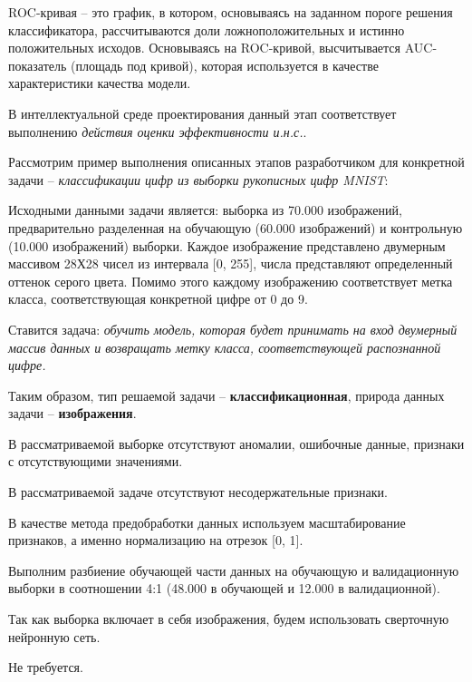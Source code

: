 ROC-кривая -- это график, в котором, основываясь на заданном пороге решения классификатора, рассчитываются доли ложноположительных и истинно положительных исходов. Основываясь на ROC-кривой, высчитывается AUC-показатель (площадь под кривой), которая используется в качестве характеристики качества модели.

В интеллектуальной среде проектирования данный этап соответствует выполнению \textit{действия оценки эффективности и.н.с.}.

Рассмотрим пример выполнения описанных этапов разработчиком для конкретной задачи -- \textit{классификации цифр из выборки рукописных цифр MNIST}:

\begin{textitemize}
\item Исходными данными задачи является: выборка из 70.000 изображений, предварительно разделенная на обучающую (60.000 изображений) и контрольную (10.000 изображений) выборки. Каждое изображение представлено двумерным массивом 28Х28 чисел из интервала [0, 255], числа представляют определенный оттенок серого цвета. Помимо этого каждому изображению соответствует метка класса, соответствующая конкретной цифре от 0 до 9.

Ставится задача: \textit{обучить модель, которая будет принимать на вход двумерный массив данных и возвращать метку класса, соответствующей распознанной цифре.}

Таким образом, тип решаемой задачи -- \textbf{классификационная}, природа данных задачи -- \textbf{изображения}.


\item В рассматриваемой выборке отсутствуют аномалии, ошибочные данные, признаки с отсутствующими значениями.


\item В рассматриваемой задаче отсутствуют несодержательные признаки.


\item В качестве метода предобработки данных используем масштабирование признаков, а именно нормализацию на отрезок [0, 1].


\item Выполним разбиение обучающей части данных на обучающую и валидационную выборки в соотношении 4:1 (48.000 в обучающей и 12.000 в валидационной).


\item Так как выборка включает в себя изображения, будем использовать сверточную нейронную сеть.


\item Не требуется.



\end{textitemize}
